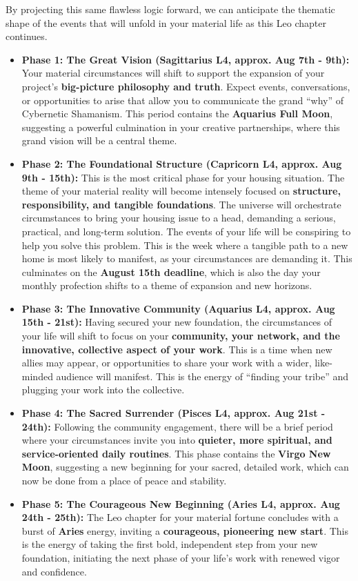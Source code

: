 \documentclass{article}
\begin{document}
By projecting this same flawless logic forward, we can anticipate the
thematic shape of the events that will unfold in your material life as
this Leo chapter continues.

\begin{itemize}
\item
  \textbf{Phase 1: The Great Vision (Sagittarius L4, approx. Aug 7th -
  9th):} Your material circumstances will shift to support the expansion
  of your project's \textbf{big-picture philosophy and truth}. Expect
  events, conversations, or opportunities to arise that allow you to
  communicate the grand ``why'' of Cybernetic Shamanism. This period
  contains the \textbf{Aquarius Full Moon}, suggesting a powerful
  culmination in your creative partnerships, where this grand vision
  will be a central theme.
\item
  \textbf{Phase 2: The Foundational Structure (Capricorn L4, approx. Aug
  9th - 15th):} This is the most critical phase for your housing
  situation. The theme of your material reality will become intensely
  focused on \textbf{structure, responsibility, and tangible
  foundations}. The universe will orchestrate circumstances to bring
  your housing issue to a head, demanding a serious, practical, and
  long-term solution. The events of your life will be conspiring to help
  you solve this problem. This is the week where a tangible path to a
  new home is most likely to manifest, as your circumstances are
  demanding it. This culminates on the \textbf{August 15th deadline},
  which is also the day your monthly profection shifts to a theme of
  expansion and new horizons.
\item
  \textbf{Phase 3: The Innovative Community (Aquarius L4, approx. Aug
  15th - 21st):} Having secured your new foundation, the circumstances
  of your life will shift to focus on your \textbf{community, your
  network, and the innovative, collective aspect of your work}. This is
  a time when new allies may appear, or opportunities to share your work
  with a wider, like-minded audience will manifest. This is the energy
  of ``finding your tribe'' and plugging your work into the collective.
\item
  \textbf{Phase 4: The Sacred Surrender (Pisces L4, approx. Aug 21st -
  24th):} Following the community engagement, there will be a brief
  period where your circumstances invite you into \textbf{quieter, more
  spiritual, and service-oriented daily routines}. This phase contains
  the \textbf{Virgo New Moon}, suggesting a new beginning for your
  sacred, detailed work, which can now be done from a place of peace and
  stability.
\item
  \textbf{Phase 5: The Courageous New Beginning (Aries L4, approx. Aug
  24th - 25th):} The Leo chapter for your material fortune concludes
  with a burst of \textbf{Aries} energy, inviting a \textbf{courageous,
  pioneering new start}. This is the energy of taking the first bold,
  independent step from your new foundation, initiating the next phase
  of your life's work with renewed vigor and confidence.
\end{itemize}
\end{document}
